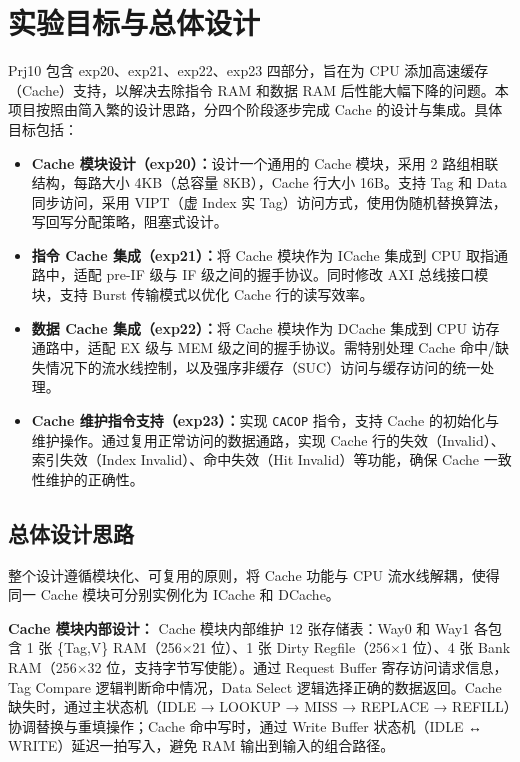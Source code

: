 \documentclass[11pt]{article}
\begin{document}
\newcommand{\name}{袁晨圃, 王永生, 李知谦}
\newcommand{\studentNum}{19}
\newcommand{\major}{计算机科学与技术}
\newcommand{\labNum}{20,21,22,23}
\newcommand{\labName}{Cache 设计}



\section{实验目标与总体设计}

Prj10 包含 exp20、exp21、exp22、exp23 四部分，旨在为 CPU 添加高速缓存（Cache）支持，以解决去除指令 RAM 和数据 RAM 后性能大幅下降的问题。本项目按照由简入繁的设计思路，分四个阶段逐步完成 Cache 的设计与集成。具体目标包括：

\begin{itemize}
    \item \textbf{Cache 模块设计（exp20）：}设计一个通用的 Cache 模块，采用 2 路组相联结构，每路大小 4KB（总容量 8KB），Cache 行大小 16B。支持 Tag 和 Data 同步访问，采用 VIPT（虚 Index 实 Tag）访问方式，使用伪随机替换算法，写回写分配策略，阻塞式设计。
    \item \textbf{指令 Cache 集成（exp21）：}将 Cache 模块作为 ICache 集成到 CPU 取指通路中，适配 pre-IF 级与 IF 级之间的握手协议。同时修改 AXI 总线接口模块，支持 Burst 传输模式以优化 Cache 行的读写效率。
    \item \textbf{数据 Cache 集成（exp22）：}将 Cache 模块作为 DCache 集成到 CPU 访存通路中，适配 EX 级与 MEM 级之间的握手协议。需特别处理 Cache 命中/缺失情况下的流水线控制，以及强序非缓存（SUC）访问与缓存访问的统一处理。
    \item \textbf{Cache 维护指令支持（exp23）：}实现 \verb|CACOP| 指令，支持 Cache 的初始化与维护操作。通过复用正常访问的数据通路，实现 Cache 行的失效（Invalid）、索引失效（Index Invalid）、命中失效（Hit Invalid）等功能，确保 Cache 一致性维护的正确性。
\end{itemize}

\subsection{总体设计思路}

整个设计遵循模块化、可复用的原则，将 Cache 功能与 CPU 流水线解耦，使得同一 Cache 模块可分别实例化为 ICache 和 DCache。

\textbf{Cache 模块内部设计：}
Cache 模块内部维护 12 张存储表：Way0 和 Way1 各包含 1 张 \{Tag,V\} RAM（256×21 位）、1 张 Dirty Regfile（256×1 位）、4 张 Bank RAM（256×32 位，支持字节写使能）。通过 Request Buffer 寄存访问请求信息，Tag Compare 逻辑判断命中情况，Data Select 逻辑选择正确的数据返回。Cache 缺失时，通过主状态机（IDLE → LOOKUP → MISS → REPLACE → REFILL）协调替换与重填操作；Cache 命中写时，通过 Write Buffer 状态机（IDLE ↔ WRITE）延迟一拍写入，避免 RAM 输出到输入的组合路径。
\end{document}
